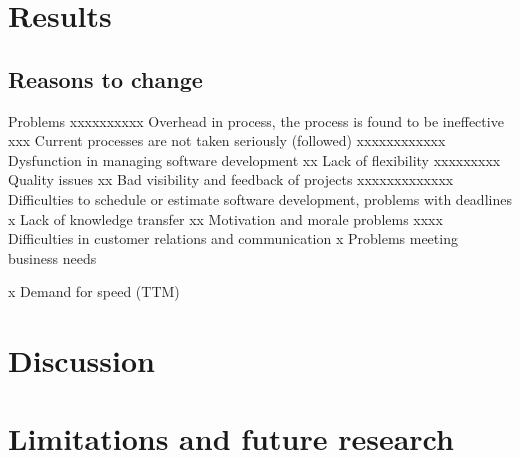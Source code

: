 \documentclass[preprint,authoryear,12pt]{elsarticle}
\begin{document}
\section{Results}
\label{sec:results}


\subsection{Reasons to change}

Problems
xxxxxxxxxx     Overhead in process, the process is found to be ineffective
xxx            Current processes are not taken seriously (followed)
xxxxxxxxxxxx   Dysfunction in managing software development
xx             Lack of flexibility
xxxxxxxxx      Quality issues
xx             Bad visibility and feedback of projects
xxxxxxxxxxxxx  Difficulties to schedule or estimate software development, problems with deadlines
x              Lack of knowledge transfer
xx             Motivation and morale problems
xxxx           Difficulties in customer relations and communication
x              Problems meeting business needs


x  Demand for speed (TTM)


\section{Discussion}
\label{sec:discussion}


\section{Limitations and future research}
\label{sec:conclusion}






\end{document}
